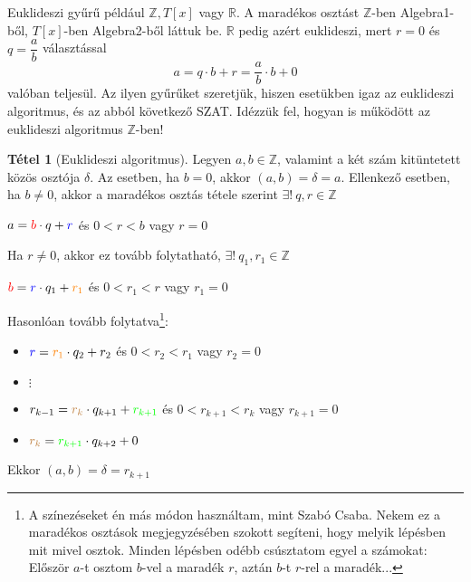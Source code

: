 \documentclass[12pt]{book}
\theoremstyle{plain} %
\theoremstyle{definition} %
\newtheorem{theo/}{Tétel}[section]
\newenvironment{theo}
  {\renewcommand{\qedsymbol}{$\clubsuit$}%
   \pushQED{\qed}\begin{theo/}}
  {\popQED\end{theo/}}
\theoremstyle{remark}
\renewcommand\qedsymbol{$\blacksquare$}
\numberwithin{equation}{section}  %
\begin{document}
	Euklideszi gyűrű például $\mathbb{Z}, T[x]$ vagy $\mathbb{R}$. A maradékos osztást $\mathbb{Z}$-ben Algebra1-ből, $T[x]$-ben Algebra2-ből láttuk be. $\mathbb{R}$ pedig azért euklideszi, mert $r=0$ és $q=\dfrac{a}{b}$ választással 
	\[ a=q\cdot b + r = \dfrac{a}{b}\cdot b + 0 \]
	valóban teljesül. Az ilyen gyűrűket szeretjük, hiszen esetükben igaz az euklideszi algoritmus, és az abból következő SZAT. Idézzük fel, hogyan is működött az euklideszi algoritmus $\mathbb{Z}$-ben!
	\begin{theo}[Euklideszi algoritmus]\label{eukl}
		Legyen $a,b\in \mathbb{Z}$, valamint a két szám kitüntetett közös osztója $\delta$. Az esetben, ha $b=0$, akkor $(a,b) = \delta = a$. Ellenkező esetben, ha $b\neq 0$, akkor a maradékos osztás tétele szerint $\exists!\ q,r\in \mathbb{Z}$
		\begin{center}
			$a= \color{red} b \color{black} \cdot q + \color{blue} r \color{black}$ \hspace{1cm} és \hspace{1cm} $0<r<b$ \hspace{0.25cm} vagy \hspace{0.25cm} $r=0$
		\end{center}
		Ha $r\neq 0$, akkor ez tovább folytatható, $\exists!\ q_1, r_1 \in \mathbb{Z}$
		\begin{center}
			$\color{red} b \color{black} =\color{blue} r \color{black} \cdot q_1 +\color{orange}r_1\color{black}$ \hspace{1cm} és \hspace{1cm} $0<r_1<r$ \hspace{0.25cm} vagy \hspace{0.25cm} $r_1=0$
		\end{center}
		Hasonlóan tovább folytatva\footnote{A színezéseket én más módon használtam, mint Szabó Csaba. Nekem ez a maradékos osztások megjegyzésében szokott segíteni, hogy melyik lépésben mit mivel osztok. Minden lépésben odébb csúsztatom egyel a számokat: Először $a$-t osztom $b$-vel a maradék $r$, aztán $b$-t $r$-rel a maradék...}:
		\begin{itemize}
			\item $\color{blue}r\color{black}=\color{orange}r_1\color{black}\cdot q_2 +r_2$ és $0<r_2<r_1$ vagy $r_2=0$
			\item $\vdots$
			\item $r_{k-1}=\color{brown}r_k \color{black} \cdot q_{k+1} +\color{green} r_{k+1} \color{black} $ és $0<r_{k+1}<r_k$ vagy $r_{k+1}=0$
			\item $\color{brown}r_k\color{black}=\color{green}r_{k+1}\color{black}\cdot q_{k+2} + 0$
		\end{itemize}
		Ekkor $(a,b)=\delta = r_{k+1}$
	\end{theo}
\end{document}
